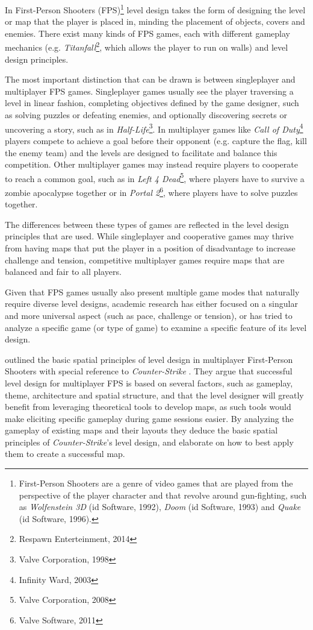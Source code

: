 \documentclass{Configuration_Files/PoliMi3i_thesis}
\begin{document}
In First-Person Shooters (FPS)\footnote{First-Person Shooters are a genre of video games that are played from the perspective of the player character and that revolve around gun-fighting, such as \textit{Wolfenstein 3D} (id Software, 1992), \textit{Doom} (id Software, 1993) and \textit{Quake} (id Software, 1996).} level design takes the form of designing the level or map that the player is placed in, minding the placement of objects, covers and enemies. There exist many kinds of FPS games, each with different gameplay mechanics (e.g. \textit{Titanfall}\footnote{Respawn Enterteinment, 2014}, which allows the player to run on walls) and level design principles. 

The most important distinction that can be drawn is between singleplayer and multiplayer FPS games. Singleplayer games usually see the player traversing a level in linear fashion, completing objectives defined by the game designer, such as solving puzzles or defeating enemies, and optionally discovering secrets or uncovering a story, such as in \textit{Half-Life}\footnote{Valve Corporation, 1998}. In multiplayer games like \textit{Call of Duty}\footnote{Infinity Ward, 2003} players compete to achieve a goal before their opponent (e.g. capture the flag, kill the enemy team) and the levels are designed to facilitate and balance this competition. Other multiplayer games may instead require players to cooperate to reach a common goal, such as in \textit{Left 4 Dead}\footnote{Valve Corporation, 2008}, where players have to survive a zombie apocalypse together or in \textit{Portal 2}\footnote{Valve Software, 2011}, where players have to solve puzzles together.

The differences between these types of games are reflected in the level design principles that are used. While singleplayer and cooperative games may thrive from having maps that put the player in a position of disadvantage to increase challenge and tension, competitive multiplayer games require maps that are balanced and fair to all players. 

Given that FPS games usually also present multiple game modes that naturally require diverse level designs, academic research has either focused on a singular and more universal aspect (such as pace, challenge or tension), or has tried to analyze a specific game (or type of game) to examine a specific feature of its level design.

 outlined the basic spatial principles of level design in multiplayer First-Person Shooters with special reference to \textit{Counter-Strike} \cite{guttler_spatial_2003}. They argue  that successful level design for multiplayer FPS is based on several factors, such as gameplay, theme, architecture and spatial structure, and that the level designer will greatly benefit from leveraging theoretical tools to develop maps, as such tools would make  eliciting specific gameplay during game sessions easier. By analyzing the gameplay of existing maps and their layouts they deduce the basic spatial principles of \textit{Counter-Strike}'s level design, and elaborate on how to best apply them to create a successful map. 
\end{document}
